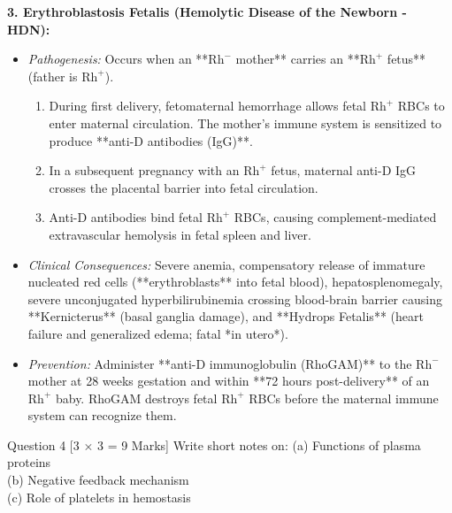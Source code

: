 \documentclass[11pt,a4paper]{article}
\begin{document}
\begin{ansbox}
\textbf{3. Erythroblastosis Fetalis (Hemolytic Disease of the Newborn - HDN):}
\begin{itemize}[leftmargin=*]
    \item \textit{Pathogenesis:} Occurs when an **$\text{Rh}^-$ mother** carries an **$\text{Rh}^+$ fetus** (father is $\text{Rh}^+$).
    \begin{enumerate}
        \item During first delivery, fetomaternal hemorrhage allows fetal $\text{Rh}^+$ RBCs to enter maternal circulation. The mother's immune system is sensitized to produce **anti-D antibodies (IgG)**.
        \item In a subsequent pregnancy with an $\text{Rh}^+$ fetus, maternal anti-D IgG crosses the placental barrier into fetal circulation.
        \item Anti-D antibodies bind fetal $\text{Rh}^+$ RBCs, causing complement-mediated extravascular hemolysis in fetal spleen and liver.
    \end{enumerate}
    \item \textit{Clinical Consequences:} Severe anemia, compensatory release of immature nucleated red cells (**erythroblasts** into fetal blood), hepatosplenomegaly, severe unconjugated hyperbilirubinemia crossing blood-brain barrier causing **Kernicterus** (basal ganglia damage), and **Hydrops Fetalis** (heart failure and generalized edema; fatal *in utero*).
    \item \textit{Prevention:} Administer **anti-D immunoglobulin (RhoGAM)** to the $\text{Rh}^-$ mother at 28 weeks gestation and within **72 hours post-delivery** of an $\text{Rh}^+$ baby. RhoGAM destroys fetal $\text{Rh}^+$ RBCs before the maternal immune system can recognize them.
\end{itemize}
\end{ansbox}

\begin{qbox}{Question 4 [3 $\times$ 3 = 9 Marks]}
Write short notes on:
(a) Functions of plasma proteins \\
(b) Negative feedback mechanism \\
(c) Role of platelets in hemostasis
\end{qbox}
\end{document}
